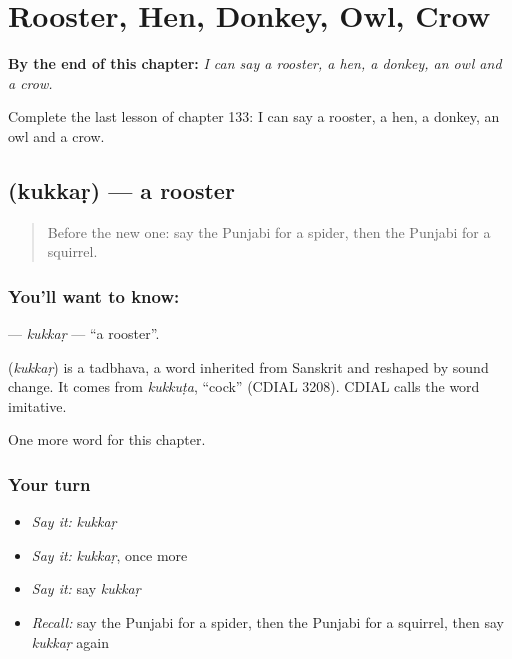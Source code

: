 
\chapter{Rooster, Hen, Donkey, Owl, Crow}
\label{ch:pa-rooster-hen-donkey-owl-crow}

\begin{chapteropening}
\textbf{By the end of this chapter:} \emph{I can say a rooster, a hen, a donkey, an owl and a crow.}

Complete the last lesson of chapter 133: I can say a rooster, a hen, a donkey, an owl and a crow.
\end{chapteropening}

\section[\texorpdfstring{\pa{ਕੁੱਕੜ} (kukkaṛ)}{ਕੁੱਕੜ (kukkaṛ)}]{ (kukkaṛ) — a rooster}

\label{lesson:PA-C133-kukkar}



\begin{quote}
Before the new one: say the Punjabi for a spider, then the Punjabi for a squirrel.
\end{quote}

\subsection*{You'll want to know: }
\textbf{} — \emph{kukkaṛ} — \textquotedblleft{}a rooster\textquotedblright{}.

\begin{cousinweb}
\textbf{} (\emph{kukkaṛ}) is a tadbhava, a word inherited from Sanskrit and reshaped by sound change. It comes from \emph{kukkuṭa}, \textquotedblleft{}cock\textquotedblright{} (CDIAL 3208). CDIAL calls the word imitative.
\end{cousinweb}

\begin{grammarlens}[title={What you've built}]
One more word for this chapter.
\end{grammarlens}

\subsection*{Your turn}
\begin{itemize}
\raggedright
  \item \emph{Say it:} \emph{kukkaṛ}
  \item \emph{Say it:} \emph{kukkaṛ}, once more
  \item \emph{Say it:} say \emph{kukkaṛ}
  \item \emph{Recall:} say the Punjabi for a spider, then the Punjabi for a squirrel, then say \emph{kukkaṛ} again
\end{itemize}

